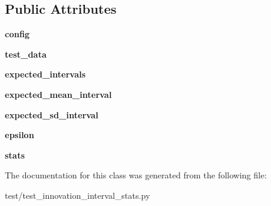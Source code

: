 \subsection*{Public Attributes}
\begin{DoxyCompactItemize}
\item 
\hypertarget{classtest__innovation__interval__stats_1_1_test_innovation_interval_stats_a4a02d72123db0217f66244540777805b}{{\bfseries config}}\label{classtest__innovation__interval__stats_1_1_test_innovation_interval_stats_a4a02d72123db0217f66244540777805b}

\item 
\hypertarget{classtest__innovation__interval__stats_1_1_test_innovation_interval_stats_a6c85d479879f3caeb308140b29a46e56}{{\bfseries test\-\_\-data}}\label{classtest__innovation__interval__stats_1_1_test_innovation_interval_stats_a6c85d479879f3caeb308140b29a46e56}

\item 
\hypertarget{classtest__innovation__interval__stats_1_1_test_innovation_interval_stats_a3126a3c7529aa52fd9de11611500a135}{{\bfseries expected\-\_\-intervals}}\label{classtest__innovation__interval__stats_1_1_test_innovation_interval_stats_a3126a3c7529aa52fd9de11611500a135}

\item 
\hypertarget{classtest__innovation__interval__stats_1_1_test_innovation_interval_stats_ac021fdf20ed2e03d3b62164c03af4703}{{\bfseries expected\-\_\-mean\-\_\-interval}}\label{classtest__innovation__interval__stats_1_1_test_innovation_interval_stats_ac021fdf20ed2e03d3b62164c03af4703}

\item 
\hypertarget{classtest__innovation__interval__stats_1_1_test_innovation_interval_stats_a690f564f03acb1ff2ba365d1fe68b75b}{{\bfseries expected\-\_\-sd\-\_\-interval}}\label{classtest__innovation__interval__stats_1_1_test_innovation_interval_stats_a690f564f03acb1ff2ba365d1fe68b75b}

\item 
\hypertarget{classtest__innovation__interval__stats_1_1_test_innovation_interval_stats_aead65a35b917b82d15e8a69abd331b88}{{\bfseries epsilon}}\label{classtest__innovation__interval__stats_1_1_test_innovation_interval_stats_aead65a35b917b82d15e8a69abd331b88}

\item 
\hypertarget{classtest__innovation__interval__stats_1_1_test_innovation_interval_stats_a970fb641bfb8dcd3b394cd0ace0a92e7}{{\bfseries stats}}\label{classtest__innovation__interval__stats_1_1_test_innovation_interval_stats_a970fb641bfb8dcd3b394cd0ace0a92e7}

\end{DoxyCompactItemize}


The documentation for this class was generated from the following file\-:\begin{DoxyCompactItemize}
\item 
test/test\-\_\-innovation\-\_\-interval\-\_\-stats.\-py\end{DoxyCompactItemize}
